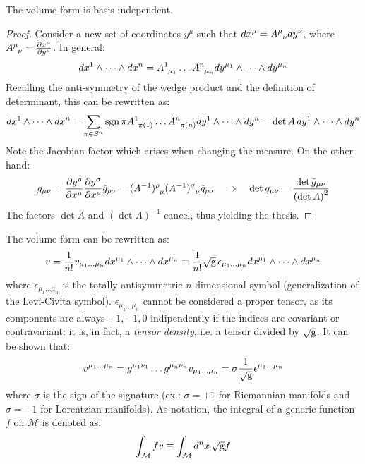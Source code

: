 \begin{proposition}
  The volume form is basis-independent.
\end{proposition}
\begin{proof}
  Consider a new set of coordinates $ y^{\mu} $ such that $ dx^{\mu} = \tensor{A}{^\mu _\nu} dy^{\nu} $, where $ \tensor{A}{^\mu _\nu} = \frac{\pa x^{\mu}}{\pa y^{\nu}} $. In general:
  \begin{equation*}
    dx^1 \wedge \dots \wedge dx^n = \tensor{A}{^1 _{\mu_1}} \dots \tensor{A}{^n _{\mu_n}} dy^{\mu_1} \wedge \dots \wedge dy^{\mu_n}
  \end{equation*}
  Recalling the anti-symmetry of the wedge product and the definition of determinant, this can be rewritten as:
  \begin{equation*}
    dx^1 \wedge \dots \wedge dx^n = \sum_{\pi \in S^n} \sgn{\pi} \tensor{A}{^1 _{\pi(1)}} \dots \tensor{A}{^n _{\pi(n)}} dy^1 \wedge \dots \wedge dy^n = \det A \, dy^1 \wedge \dots \wedge dy^n
  \end{equation*}
  Note the Jacobian factor which arises when changing the measure. On the other hand:
  \begin{equation*}
    g_{\mu \nu} = \frac{\pa y^{\rho}}{\pa x^{\mu}} \frac{\pa y^{\sigma}}{\pa x^{\nu}} \tilde{g}_{\rho \sigma} = \tensor{(A^{-1})}{^\rho _\mu} \tensor{(A^{-1})}{^\sigma _\nu} \tilde{g}_{\rho \sigma}
    \quad \Rightarrow \quad
    \det g_{\mu \nu} = \frac{\det \tilde{g}_{\mu \nu}}{\left( \det A \right)^2}
  \end{equation*}
  The factors $ \det A $ and $ \left( \det A \right)^{-1} $ cancel, thus yielding the thesis.
\end{proof}

The volume form can be rewritten as:
\begin{equation}
  v = \frac{1}{n!} v_{\mu_1 \dots \mu_n} dx^{\mu_1} \wedge \dots \wedge dx^{\mu_n} \equiv \frac{1}{n!} \sqrt{\mathrm{g}}\, \epsilon_{\mu_1 \dots \mu_n} dx^{\mu_1} \wedge \dots \wedge dx^{\mu_n}
  \label{eq:3.14}
\end{equation}
where $ \epsilon_{\mu_1 \dots \mu_n} $ is the totally-antisymmetric $ n $-dimensional symbol (generalization of the Levi-Civita symbol). $ \epsilon_{\mu_1 \dots \mu_n} $ cannot be considered a proper tensor, as its components are always $ +1,-1,0 $ indipendently if the indices are covariant or contravariant: it is, in fact, a \textit{tensor density}, i.e. a tensor divided by $ \sqrt{\mathrm{g}} $. It can be shown that:
\begin{equation}
  v^{\mu_1 \dots \mu_n} = g^{\mu_1 \nu_1} \dots g^{\mu_n \nu_n} v_{\mu_1 \dots \mu_n} = \sigma \frac{1}{\sqrt{\mathrm{g}}} \epsilon^{\mu_1 \dots \mu_n}
  \label{eq:3.15}
\end{equation}
where $ \sigma $ is the sign of the signature (ex.: $ \sigma = +1 $ for Riemannian manifolds and $ \sigma = -1 $ for Lorentzian manifolds).
As notation, the integral of a generic function $ f $ on $ \mathcal{M} $ is denoted as:
\begin{equation}
  \int_{\mathcal{M}} f v \equiv \int_{\mathcal{M}} d^n x \,\sqrt{\mathrm{g}} f
  \label{eq:3.16}
\end{equation}

